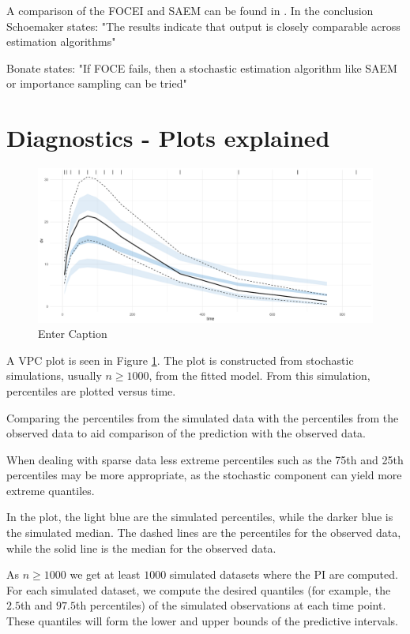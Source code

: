 A comparison of the FOCEI and SAEM can be found in \citep{Schoemaker2019}. In the conclusion Schoemaker states: "The results indicate that output is closely comparable
across estimation algorithms"

Bonate states: "If FOCE
fails, then a stochastic estimation algorithm like SAEM or
importance sampling can be tried" \citep[p.304]{bonate}


\section{Diagnostics - Plots explained}
\begin{figure}
    \centering
    \includegraphics[width=0.9\linewidth]{fig/img/Xpose/vpcPlot.pdf}
    \caption{Enter Caption}
    \label{Fig: VPC}
\end{figure}
A VPC plot is seen in Figure \ref{Fig: VPC}. The plot is constructed from stochastic simulations, usually $n \geq 1000$, from the fitted model. From this simulation, percentiles are plotted versus time. 

Comparing the percentiles from the simulated data with the percentiles from the observed data to aid comparison of the prediction with the observed data. 

When dealing with sparse data less extreme percentiles such as the 75th and 25th percentiles may be more appropriate, as the stochastic component can yield more extreme quantiles. 

In the plot, the light blue are the simulated percentiles, while the darker blue is the simulated median. The dashed lines are the percentiles for the observed data, while the solid line is the median for the observed data. 

As $n \geq 1000$ we get at least $1000$ simulated datasets where the PI are computed. For each simulated dataset, we compute the desired quantiles (for example, the $2.5$th and $97.5$th percentiles) of the simulated observations at each time point. These quantiles will form the lower and upper bounds of the predictive intervals.

